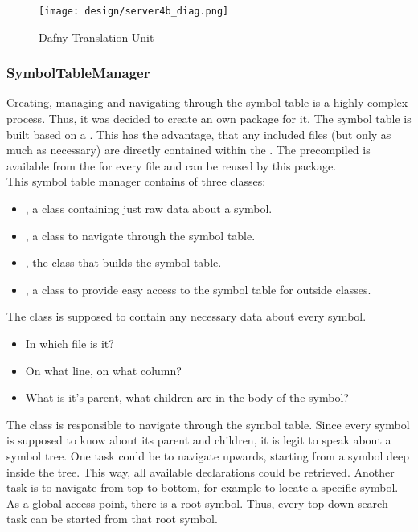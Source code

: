 \begin{figure}[H]
    \centering
    \texttt{[image: design/server4b\_diag.png]}
    \caption{Dafny Translation Unit}
    \label{fig:server_dtu}
\end{figure}



\subsubsection{SymbolTableManager}
Creating, managing and navigating through the symbol table is a highly complex process.
Thus, it was decided to create an own package for it.
The symbol table is built based on a .
This has the advantage, that any included files (but only as much as necessary) are directly contained within the .
The precompiled  is available from the  for every file and can be reused by this package.\\

This symbol table manager contains of three classes:
\begin{itemize}
    \item {}, a class containing just raw data about a symbol.
    \item {}, a class to navigate through the symbol table.
    \item {}, the class that builds the symbol table.
    \item {}, a class to provide easy access to the symbol table for outside classes.
\end{itemize}

The class  is supposed to contain any necessary data about every symbol.
\begin{itemize}
    \item In which file is it?
    \item On what line, on what column?
    \item What is it's parent, what children are in the body of the symbol?
\end{itemize}


The class  is responsible to navigate through the symbol table.
Since every symbol is supposed to know about its parent and children, it is legit to speak about a symbol tree.
One task could be to navigate upwards, starting from a symbol deep inside the tree.
This way, all available declarations could be retrieved.
Another task is to navigate from top to bottom, for example to locate a specific symbol.
As a global access point, there is a root symbol.
Thus, every top-down search task can be started from that root symbol.\\

